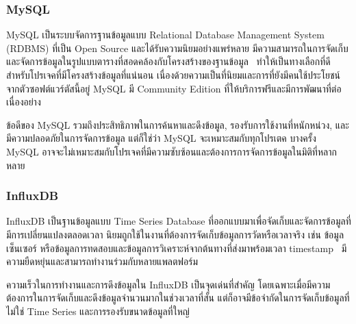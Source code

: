 \documentclass[12pt,oneside,openright,a4paper]{cpe-thai-project}
\begin{document}
        \subsubsection{MySQL}
            \begin{flushleft}
                MySQL เป็นระบบจัดการฐานข้อมูลแบบ Relational Database Management System (RDBMS) ที่เป็น Open Source และได้รับความนิยมอย่างแพร่หลาย มีความสามารถในการจัดเก็บและจัดการข้อมูลในรูปแบบตารางที่สอดคล้องกับโครงสร้างของฐานข้อมูล~\cite{mysql} ทำให้เป็นทางเลือกที่ดีสำหรับโปรเจคที่มีโครงสร้างข้อมูลที่แน่นอน เนื่องด้วยความเป็นที่นิยมและการที่ยังมีคนใช้ประโยชน์จากตัวซอฟต์แวร์ตัสนี้อยู่ MySQL มี Community Edition ที่ให้บริการฟรีและมีการพัฒนาที่ต่อเนื่องอย่าง~\cite{mysqlcomm}
            \end{flushleft}
            \begin{flushleft}
                ข้อดีของ MySQL รวมถึงประสิทธิภาพในการค้นหาและดึงข้อมูล, รองรับการใช้งานที่หนักหน่วง, และมีความปลอดภัยในการจัดการข้อมูล แต่ก็ใช่ว่า MySQL จะเหมาะสมกับทุกโปรเตค  บางครั้ง MySQL อาจจะไม่เหมาะสมกับโปรเจคที่มีความซับซ้อนและต้องการการจัดการข้อมูลในมิติที่หลากหลาย
            \end{flushleft}
        \subsubsection{InfluxDB}
            \begin{flushleft}
                InfluxDB เป็นฐานข้อมูลแบบ Time Series Database ที่ออกแบบมาเพื่อจัดเก็บและจัดการข้อมูลที่มีการเปลี่ยนแปลงตลอดเวลา นิยมถูกใช้ในงานที่ต้องการจัดเก็บข้อมูลการวัดหรือเวลาจริง เช่น ข้อมูลเซ็นเซอร์ หรือข้อมูลการทดสอบและข้อมูลการวิเคราะห์จากต้นทางที่ส่งมาพร้อมเวลา timestamp~\cite{influxdb} มีความยืดหยุ่นและสามารถทำงานร่วมกับหลายแพลตฟอร์ม~\cite{influxdb-platforms}
            \end{flushleft}
            \begin{flushleft}
                ความเร็วในการทำงานและการดึงข้อมูลใน InfluxDB เป็นจุดเด่นที่สำคัญ โดยเฉพาะเมื่อมีความต้องการในการจัดเก็บและดึงข้อมูลจำนวนมากในช่วงเวลาที่สั้น แต่ก็อาจมีข้อจำกัดในการจัดเก็บข้อมูลที่ไม่ใช่ Time Series และการรองรับขนาดข้อมูลที่ใหญ่
            \end{flushleft}
\end{document}
